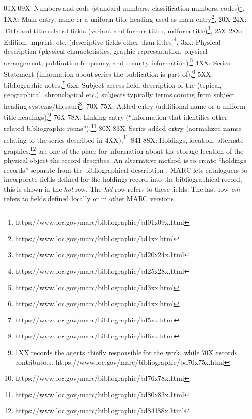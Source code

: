 01X-09X: Numbers and code (standard numbers, classification numbers, codes)\footnote{https://www.loc.gov/marc/bibliographic/bd01x09x.html}. 1XX: Main entry, name or a uniform title heading used as main entry\footnote{https://www.loc.gov/marc/bibliographic/bd1xx.html}, 20X-24X: Title and title-related fields (variant and former titles, uniform title)\footnote{https://www.loc.gov/marc/bibliographic/bd20x24x.html}, 25X-28X: Edition, imprint, etc. (descriptive fields other than titles)\footnote{https://www.loc.gov/marc/bibliographic/bd25x28x.html}, 3xx: Physical description (physical characteristics, graphic representation, physical arrangement, publication frequency, and security information),\footnote{https://www.loc.gov/marc/bibliographic/bd3xx.html} 4XX: Series Statement (information about series the publication is part of),\footnote{https://www.loc.gov/marc/bibliographic/bd4xx.html} 5XX: bibliographic notes,\footnote{https://www.loc.gov/marc/bibliographic/bd5xx.html} 6xx: Subject access field, description of the (topical, geographical, chronological etc.) subjects typically terms coming from subject heading systems/thesauri\footnote{https://www.loc.gov/marc/bibliographic/bd6xx.html}, 70X-75X: Added entry (additional name or a uniform title headings),\footnote{1XX records the agents chiefly responsible for the work, while 70X records contributors. 
https://www.loc.gov/marc/bibliographic/bd70x75x.html} 76X-78X: Linking entry (``information that identifies other related bibliographic items''),\footnote{https://www.loc.gov/marc/bibliographic/bd76x78x.html} 80X-83X: Series added entry (normalized names relating to the series described in 4XX),\footnote{https://www.loc.gov/marc/bibliographic/bd80x83x.html} 841-88X: Holdings, location, alternate graphics,\footnote{https://www.loc.gov/marc/bibliographic/bd84188x.html} are one of the place for information about the storage location of the physical object the record describes. An alternative method is to create ``holdings records'' separate from the bibliographical description \cite{marc21holdings2000}. MARC lets cataloguers to incorporate fields defined for the holdings record into the bibliographical record, this is shown in the \emph{hol} row. The \emph{hld} row refers to these fields. The last row \emph{oth} refers to fields defined locally or in other MARC versions.

